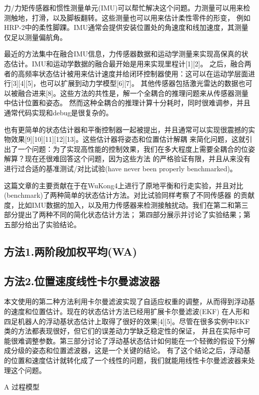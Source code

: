 力/力矩传感器和惯性测量单元(IMU)可以帮忙解决这个问题。力测量可以用来检测触地，打滑，以及脚板翻转。这些测量也可以用来估计柔性零件的形变，
例如HRP-2中的柔性脚踝。IMU通常会提供安装位置处的角速度和线加速度，其测量仅足以测量偏航角。

最近的方法集中在融合IMU信息，力传感器数据和运动学测量来实现高保真的状态估计。IMU和运动学数据的融合最开始是用来实现里程计[1][2]。
之后，融合两者的高频率状态估计被用来估计速度并给闭环控制器使用：这可以在运动学层面进行[3][4][5]，也可以扩展到动力学模型[6][7]。
其他传感器包括激光雷达的数据也可以被融合进来[8]。这些方法的共性是，解一个全耦合的推理问题来从传感器测量中估计位置和姿态。
然而这种全耦合的推理计算十分耗时，同时很难调参，并且通常代码实现和debug是很复杂的。

也有更简单的状态估计器和平衡控制器一起被提出，并且通常可以实现很震撼的实物效果[9][10][11][12][13]。这些估计器将姿态和位置估计解耦
来简化问题，这就引出了一个问题：为了实现高性能的控制效果，我们在多大程度上需要全耦合的位姿解算？现在还很难回答这个问题，因为这些方法
的严格验证有限，并且从来没有进行过合适的基准测试/对比试验(have never been properly benchmarked)。

这篇文章的主要贡献在于在WuKong4上进行了原地平衡和行走实验，并且对比(benchmark)了两种简单的状态估计方法。对比试验同样考察了不同传感器
的贡献度，比如IMU数据的加入，以及用力传感器来检测接触扰动。我们在第二和第三部分提出了两种不同的简化状态估计方法；
第四部分展示并讨论了实验结果；第五部分给出了实验结论。

\subsection{方法1.两阶段加权平均(WA)}

\subsection{方法2.位置速度线性卡尔曼滤波器}
本文使用的第二种方法利用卡尔曼滤波实现了自适应权重的调整，从而得到浮动基的速度和位置估计。现在的状态估计方法已经用扩展卡尔曼滤波(EKF)
在人形和四足机器人的浮动基状态估计上取得了很好的效果[4][5]。尽管在很多实例中EKF类的方法都表现很好，但它们的误差动力学缺乏稳定性的保证，
并且在实际中可能很难调整参数。第三部分讨论了浮动基状态估计如何能在一个轻微的假设下分解成分级的姿态和位置滤波器，这是一个关键的结论。
有了这个结论之后，浮动基的位置和速度估计就转化成了一个线性的问题，我们就能用线性卡尔曼滤波器来处理这个问题。

A 过程模型

